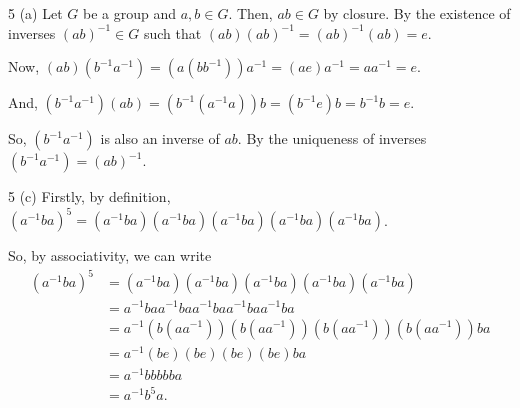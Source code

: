 \documentclass[11pt]{penrose}
\begin{document}
\begin{problem}{5 (a)}
    Let $G$ be a group and $a, b \in G$. Then, $ab \in G$ by closure. By the existence of inverses $(ab)^{-1} \in G$ such that $(ab) (ab)^{-1} = (ab)^{-1} (ab) = e$.

    Now, $(ab)(b^{-1}a^{-1}) = (a(bb^{-1}))a^{-1} = (ae)a^{-1} =aa^{-1} = e$.
    
    And, $(b^{-1}a^{-1})(ab) = (b^{-1}(a^{-1}a))b = (b^{-1}e)b =b^{-1}b = e$.

    So, $(b^{-1}a^{-1})$ is also an inverse of $ab$. By the uniqueness of inverses $(b^{-1}a^{-1}) = (ab)^{-1}$.
\end{problem}

\begin{problem}{5 (c)}
    Firstly, by definition, $(a^{-1} b a)^5 = (a^{-1} b a) (a^{-1} b a) (a^{-1} b a) (a^{-1} b a) (a^{-1} b a)$.

    So, by associativity, we can write
    \begin{align*}
        (a^{-1} b a)^5
        &= (a^{-1} b a) (a^{-1} b a) (a^{-1} b a) (a^{-1} b a) (a^{-1} b a)\\
        &= a^{-1} b a a^{-1} b a a^{-1} b a a^{-1} b a a^{-1} b a\\
        &= a^{-1} (b (a a^{-1})) (b (a a^{-1})) (b (a a^{-1})) (b (a a^{-1})) b a\\
        &= a^{-1} (b e) (b e) (b e) (b e) b a\\
        &= a^{-1} b b b b b a\\
        &= a^{-1} b^5 a.
    \end{align*}
\end{problem}
\end{document}

